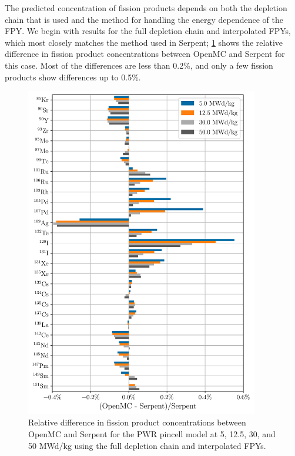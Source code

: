 \documentclass[3p,authoryear]{elsarticle}
\begin{document}
The predicted concentration of fission products depends on both the depletion
chain that is used and the method for handling the energy dependence of the FPY.
We begin with results for the full depletion chain and interpolated FPYs, which
most closely matches the method used in Serpent; \cref{fig:pwr-fp-full-average}
shows the relative difference in fission product concentrations between OpenMC
and Serpent for this case. Most of the differences are less than 0.2\%, and only
a few fission products show differences up to 0.5\%.
\begin{figure}[H]
  \centering
  \includegraphics[width=4in]{figures/pwr_fp_full_average.pdf}
  \caption{Relative difference in fission product concentrations between OpenMC
  and Serpent for the PWR pincell model at 5, 12.5, 30, and 50 MWd/kg using the
  full depletion chain and interpolated FPYs.}
  \label{fig:pwr-fp-full-average}
\end{figure}
\end{document}
